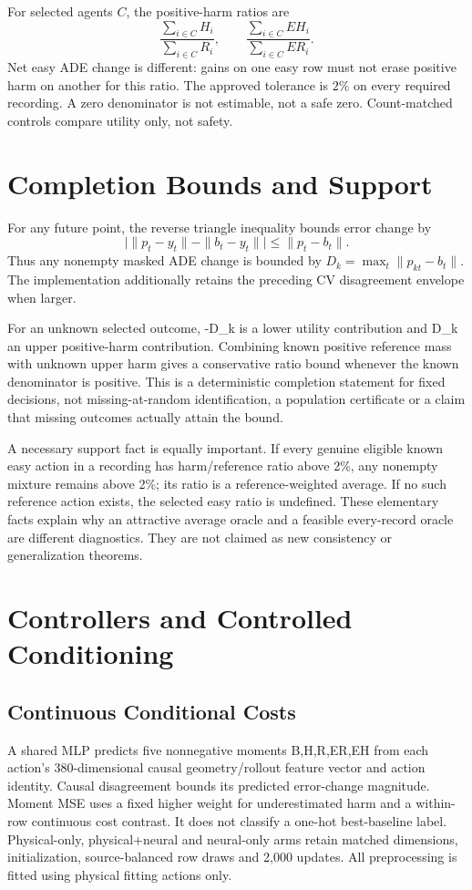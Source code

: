 \documentclass[10pt,twocolumn,letterpaper]{article}
\begin{document}
For selected agents $C$, the positive-harm ratios are
\begin{equation}
\frac{\sum_{i\in C}H_i}{\sum_{i\in C}R_i},\qquad
\frac{\sum_{i\in C}EH_i}{\sum_{i\in C}ER_i}.
\end{equation}
Net easy ADE change is different: gains on one easy row must not erase positive harm on another for this ratio.
The approved tolerance is $2\%$ on every required recording.
A zero denominator is not estimable, not a safe zero. Count-matched controls compare utility only, not safety.


\section{Completion Bounds and Support}
For any future point, the reverse triangle inequality bounds error change by
\begin{equation}
\big|\|p_t-y_t\|-\|b_t-y_t\|\big|\leq\|p_t-b_t\|.
\end{equation}
Thus any nonempty masked ADE change is bounded by $D_k=\max_t\|p_{kt}-b_t\|$.
The implementation additionally retains the preceding CV disagreement envelope when larger.


For an unknown selected outcome, -D\_k is a lower utility contribution and D\_k
an upper positive-harm contribution. Combining known positive reference mass
with unknown upper harm gives a conservative ratio bound whenever the known
denominator is positive. This is a deterministic completion statement for
fixed decisions, not missing-at-random identification, a population certificate
or a claim that missing outcomes actually attain the bound.

A necessary support fact is equally important. If every genuine eligible known
easy action in a recording has harm/reference ratio above 2\%, any nonempty
mixture remains above 2\%; its ratio is a reference-weighted average. If no such
reference action exists, the selected easy ratio is undefined. These elementary
facts explain why an attractive average oracle and a feasible every-record
oracle are different diagnostics. They are not claimed as new consistency or
generalization theorems.

\section{Controllers and Controlled Conditioning}
\subsection{Continuous Conditional Costs}
A shared MLP predicts five nonnegative moments B,H,R,ER,EH from each action's
380-dimensional causal geometry/rollout feature vector and action identity.
Causal disagreement bounds its predicted error-change magnitude. Moment MSE
uses a fixed higher weight for underestimated harm and a within-row continuous
cost contrast. It does not classify a one-hot best-baseline label. Physical-only,
physical+neural and neural-only arms retain matched dimensions, initialization,
source-balanced row draws and 2,000 updates. All preprocessing is fitted using
physical fitting actions only.
\end{document}
